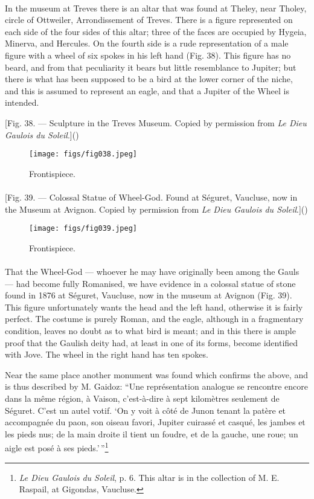 \documentclass[a4paper, 11pt, oneside, polutonikogreek, english]{article}
\begin{document}
\paragraph{}
In the museum at Treves there is an altar that was found at Theley, near Tholey, circle of Ottweiler, Arrondissement of Treves. There is a figure represented on each side of the four sides of this altar; three of the faces are occupied by Hygeia, Minerva, and Hercules. On the fourth side is a rude representation of a male figure with a wheel of six spokes in his left hand (Fig. 38). This figure has no beard, and from that peculiarity it bears but little resemblance to Jupiter; but there is what has been supposed to be a bird at the lower corner of the niche, and this is assumed to represent an eagle, and that a Jupiter of the Wheel is intended.

[Fig. 38. --- Sculpture in the Treves Museum. Copied by permission from \emph{Le Dieu Gaulois du Soleil}.]()
\begin{figure}[H]
\centering
\texttt{[image: figs/fig038.jpeg]}
\caption{Frontispiece.}
\end{figure}
\paragraph{}
[Fig. 39. --- Colossal Statue of Wheel-God. Found at Séguret, Vaucluse, now in the Museum at Avignon. Copied by permission from \emph{Le Dieu Gaulois du Soleil}.]()
\begin{figure}[H]
\centering
\texttt{[image: figs/fig039.jpeg]}
\caption{Frontispiece.}
\end{figure}
\paragraph{}
That the Wheel-God --- whoever he may have originally been among the Gauls --- had become fully Romanised, we have evidence in a colossal statue of stone found in 1876 at Séguret, Vaucluse, now in the museum at Avignon (Fig. 39). This figure unfortunately wants the head and the left hand, otherwise it is fairly perfect. The costume is purely Roman, and the eagle, although in a fragmentary condition, leaves no doubt as to what bird is meant; and in this there is ample proof that the Gaulish deity had, at least in one of its forms, become identified with Jove. The wheel in the right hand has ten spokes.

Near the same place another monument was found which confirms the above, and is thus described by M. Gaidoz: ``Une représentation analogue se rencontre encore dans la même région, à Vaison, c'est-à-dire à sept kilomètres seulement de Séguret. C'est un autel votif. `On y voit à côté de Junon tenant la patère et accompagnée du paon, son oiseau favori, Jupiter cuirassé et casqué, les jambes et les pieds nus; de la main droite il tient un foudre, et de la gauche, une roue; un aigle est posé à ses pieds.'\,''\footnote{\emph{Le Dieu Gaulois du Soleil}, p. 6. This altar is in the collection of M. E. Raspail, at Gigondas, Vaucluse.}
\end{document}
